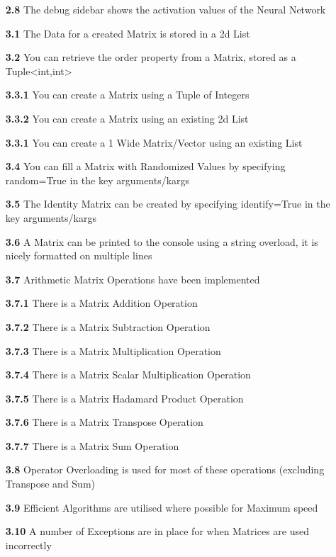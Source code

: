 \begin{flushleft}
\begin{itemize}
            \item[\textbf{2.8}] The debug sidebar shows the activation values of the Neural Network
            \item[\textbf{3.1}] The Data for a created Matrix is stored in a 2d List
            \item[\textbf{3.2}] You can retrieve the \textsf{order} property from a Matrix, stored as a Tuple<int,int>
            \item[\textbf{3.3.1}] You can create a Matrix using a Tuple of Integers
            \item[\textbf{3.3.2}] You can create a Matrix using an existing 2d List
            \item[\textbf{3.3.1}] You can create a 1 Wide Matrix/Vector using an existing List
            \item[\textbf{3.4}] You can fill a Matrix with Randomized Values by specifying \textsf{random=True} in the key arguments/kargs 
            \item[\textbf{3.5}] The Identity Matrix can be created by specifying \textsf{identify=True} in the key arguments/kargs 
            \item[\textbf{3.6}] A Matrix can be printed to the console using a string overload, it is nicely formatted on multiple lines
            \item[\textbf{3.7}] Arithmetic Matrix Operations have been implemented
            \item[\textbf{3.7.1}] There is a Matrix Addition Operation
            \item[\textbf{3.7.2}] There is a Matrix Subtraction Operation
            \item[\textbf{3.7.3}] There is a Matrix Multiplication Operation
            \item[\textbf{3.7.4}] There is a Matrix Scalar Multiplication Operation
            \item[\textbf{3.7.5}] There is a Matrix Hadamard Product Operation
            \item[\textbf{3.7.6}] There is a Matrix Transpose Operation
            \item[\textbf{3.7.7}] There is a Matrix Sum Operation
            \item[\textbf{3.8}] Operator Overloading is used for most of these operations (excluding Transpose and Sum)
            \item[\textbf{3.9}] Efficient Algorithms are utilised where possible for Maximum speed
            \item[\textbf{3.10}] A number of Exceptions are in place for when Matrices are used incorrectly

\end{itemize}
\end{flushleft}
